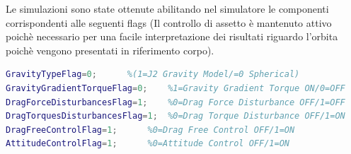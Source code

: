 Le simulazioni sono state ottenute abilitando nel simulatore le componenti
corrispondenti alle seguenti flags (Il controllo di assetto è mantenuto attivo
poichè necessario per una facile interpretazione dei risultati riguardo
l'orbita poichè vengono presentati in riferimento corpo).

\begin{lstlisting}[language=matlab,breaklines=true]
GravityTypeFlag=0;		%(1=J2 Gravity Model/=0 Spherical)
GravityGradientTorqueFlag=0;	%1=Gravity Gradient Torque ON/0=OFF 
DragForceDisturbancesFlag=1;	%0=Drag Force Disturbance OFF/1=OFF
DragTorquesDisturbancesFlag=1;	%0=Drag Torque Disturbance OFF/1=ON
DragFreeControlFlag=1;		%0=Drag Free Control OFF/1=ON
AttitudeControlFlag=1;		%0=Attitude Control OFF/1=ON
\end{lstlisting}

